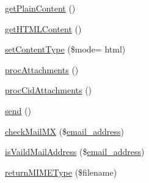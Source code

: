 \begin{DoxyCompactItemize}
\item 
\hyperlink{classMail_ac1a5a2b325a14e6331f13d2b2b18d9f8}{get\+Plain\+Content} ()
\item 
\hyperlink{classMail_a74db66148c78f2e732a3f2797b108eae}{get\+H\+T\+M\+L\+Content} ()
\item 
\hyperlink{classMail_adc8e047b6acd8b183bac7082180cb18f}{set\+Content\+Type} (\$mode= \textquotesingle{}html\textquotesingle{})
\item 
\hyperlink{classMail_a136e94d3b4ae6cea8944cf05f58754ce}{proc\+Attachments} ()
\item 
\hyperlink{classMail_a185f66ac96139a53251ede273a120d13}{proc\+Cid\+Attachments} ()
\item 
\hyperlink{classMail_a6520941b529c223c1b59ec7544f7f7d6}{send} ()
\item 
\hyperlink{classMail_a0bdfc629861cf1048ac189d61fd57ef4}{check\+Mail\+M\+X} (\$\hyperlink{ko_8install_8php_a1dffea0d5ba8194f8ef01f414af0c831}{email\+\_\+address})
\item 
\hyperlink{classMail_a2d7fd899ae79dc18e7804a044127dbac}{is\+Vaild\+Mail\+Address} (\$\hyperlink{ko_8install_8php_a1dffea0d5ba8194f8ef01f414af0c831}{email\+\_\+address})
\item 
\hyperlink{classMail_afe036d54e43919318cb8e081533e7b90}{return\+M\+I\+M\+E\+Type} (\$filename)
\end{DoxyCompactItemize}
